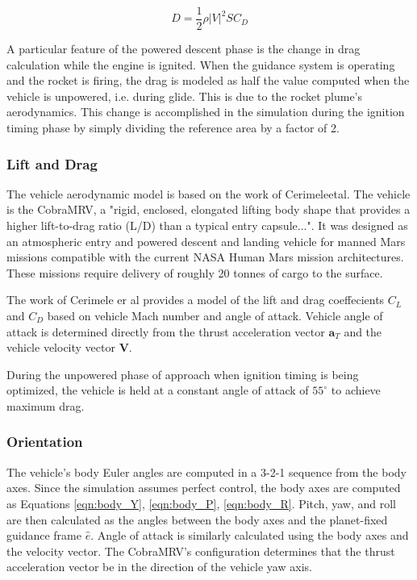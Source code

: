\begin{equation}
\label{eqn:drag}
D = \frac{1}{2} \rho |V|^2 S C_D
\end{equation}

A particular feature of the powered descent phase is the change in drag calculation while the engine is ignited. When the guidance system is operating and the rocket is firing, the drag is modeled as half the value computed when the vehicle is unpowered, i.e. during glide. This is due to the rocket plume's aerodynamics. This change is accomplished in the simulation during the ignition timing phase by simply dividing the reference area by a factor of 2. 

\subsubsection{Lift and Drag}
The vehicle aerodynamic model is based on the work of Cerimele\:et\:al\:\cite{CERIMELE}. The vehicle is the CobraMRV, a "rigid, enclosed, elongated lifting body shape that provides a higher lift-to-drag ratio (L/D) than a typical entry capsule..."\:\cite{CERIMELE}. It was designed as an atmospheric entry and powered descent and landing vehicle for manned Mars missions compatible with the current NASA Human Mars mission architectures. These missions require delivery of roughly 20 tonnes of cargo to the surface.

The work of Cerimele er al provides a model of the lift and drag coeffecients $C_L$ and $C_D$ based on vehicle Mach number and angle of attack. Vehicle angle of attack is determined directly from the thrust acceleration vector $\bm{a}_T$ and the vehicle velocity vector $\bm{V}$. 

During the unpowered phase of approach when ignition timing is being optimized, the vehicle is held at a constant angle of attack of $55^{\circ}$ to achieve maximum drag. 

\subsubsection{Orientation}
The vehicle's body Euler angles are computed in a 3-2-1 sequence from the body axes. Since the simulation assumes perfect control, the body axes are computed as Equations \ref{eqn:body_Y}, \ref{eqn:body_P}, \ref{eqn:body_R}. Pitch, yaw, and roll are then calculated as the angles between the body axes and the planet-fixed guidance frame $\hat{e}$. Angle of attack is similarly calculated using the body axes and the velocity vector. The CobraMRV's configuration determines that the thrust acceleration vector be in the direction of the vehicle yaw axis.

